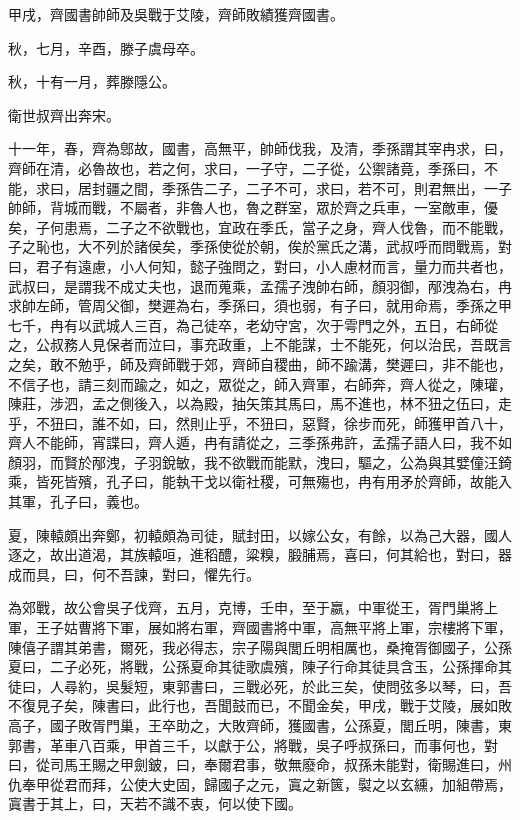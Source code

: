 \begin{pinyinscope}
甲戌，齊國書帥師及吳戰于艾陵，齊師敗績獲齊國書。

秋，七月，辛酉，滕子虞母卒。

秋，十有一月，葬滕隱公。

衛世叔齊出奔宋。

十一年，春，齊為鄎故，國書，高無平，帥師伐我，及清，季孫謂其宰冉求，曰，齊師在清，必魯故也，若之何，求曰，一子守，二子從，公禦諸竟，季孫曰，不能，求曰，居封疆之間，季孫告二子，二子不可，求曰，若不可，則君無出，一子帥師，背城而戰，不屬者，非魯人也，魯之群室，眾於齊之兵車，一室敵車，優矣，子何患焉，二子之不欲戰也，宜政在季氏，當子之身，齊人伐魯，而不能戰，子之恥也，大不列於諸侯矣，季孫使從於朝，俟於黨氏之溝，武叔呼而問戰焉，對曰，君子有遠慮，小人何知，懿子強問之，對曰，小人慮材而言，量力而共者也，武叔曰，是謂我不成丈夫也，退而蒐乘，孟孺子洩帥右師，顏羽御，邴洩為右，冉求帥左師，管周父御，樊遲為右，季孫曰，須也弱，有子曰，就用命焉，季孫之甲七千，冉有以武城人三百，為己徒卒，老幼守宮，次于雩門之外，五日，右師從之，公叔務人見保者而泣曰，事充政重，上不能謀，士不能死，何以治民，吾既言之矣，敢不勉乎，師及齊師戰于郊，齊師自稷曲，師不踰溝，樊遲曰，非不能也，不信子也，請三刻而踰之，如之，眾從之，師入齊軍，右師奔，齊人從之，陳瓘，陳莊，涉泗，孟之側後入，以為殿，抽矢策其馬曰，馬不進也，林不狃之伍曰，走乎，不狃曰，誰不如，曰，然則止乎，不狃曰，惡賢，徐步而死，師獲甲首八十，齊人不能師，宵諜曰，齊人遁，冉有請從之，三季孫弗許，孟孺子語人曰，我不如顏羽，而賢於邴洩，子羽銳敏，我不欲戰而能默，洩曰，驅之，公為與其嬖僮汪錡乘，皆死皆殯，孔子曰，能執干戈以衛社稷，可無殤也，冉有用矛於齊師，故能入其軍，孔子曰，義也。

夏，陳轅頗出奔鄭，初轅頗為司徒，賦封田，以嫁公女，有餘，以為己大器，國人逐之，故出道渴，其族轅咺，進稻醴，粱糗，腶脯焉，喜曰，何其給也，對曰，器成而具，曰，何不吾諫，對曰，懼先行。

為郊戰，故公會吳子伐齊，五月，克博，壬申，至于嬴，中軍從王，胥門巢將上軍，王子姑曹將下軍，展如將右軍，齊國書將中軍，高無平將上軍，宗樓將下軍，陳僖子謂其弟書，爾死，我必得志，宗子陽與閭丘明相厲也，桑掩胥御國子，公孫夏曰，二子必死，將戰，公孫夏命其徒歌虞殯，陳子行命其徒具含玉，公孫揮命其徒曰，人尋約，吳髮短，東郭書曰，三戰必死，於此三矣，使問弦多以琴，曰，吾不復見子矣，陳書曰，此行也，吾聞鼓而已，不聞金矣，甲戌，戰于艾陵，展如敗高子，國子敗胥門巢，王卒助之，大敗齊師，獲國書，公孫夏，閭丘明，陳書，東郭書，革車八百乘，甲首三千，以獻于公，將戰，吳子呼叔孫曰，而事何也，對曰，從司馬王賜之甲劍鈹，曰，奉爾君事，敬無廢命，叔孫未能對，衛賜進曰，州仇奉甲從君而拜，公使大史固，歸國子之元，寘之新篋，褽之以玄纁，加組帶焉，寘書于其上，曰，天若不識不衷，何以使下國。


\end{pinyinscope}
